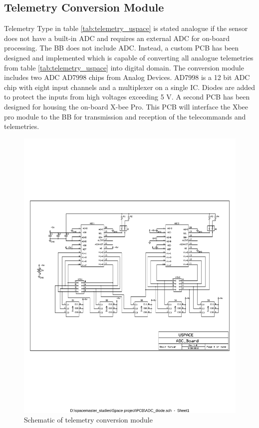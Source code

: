 \subsection{Telemetry Conversion Module}
\label{sec:telemetryConv}
%
Telemetry Type in table \ref{tab:telemetry_uspace} is stated analogue if the sensor does not have a built-in \ac{ADC} and requires an external \ac{ADC} for on-board processing. The \ac{BB} does not include \ac{ADC}. Instead, a custom \ac{PCB} has been designed and implemented which is capable of converting all analogue telemetries from table \ref{tab:telemetry_uspace} into digital domain. The conversion module includes two ADC AD7998 chips  from Analog Devices. AD7998 is a 12 bit \ac{ADC} chip with eight input channels and a multiplexer on a single IC. Diodes are added to protect the inputs from high voltages exceeding 5 V. A second PCB has been designed for housing the on-board X-bee Pro. This \ac{PCB} will interface the Xbee pro module to 
the \ac{BB} for transmission and reception of the telecommands and telemetries.\\
%
\begin{figure}[bht]
\centering
\includegraphics[scale=0.7]{figures/schematic_conversion_module.pdf}
\caption{Schematic of telemetry conversion module}
\label{fig:schematic_conversion_module}
\end{figure}

